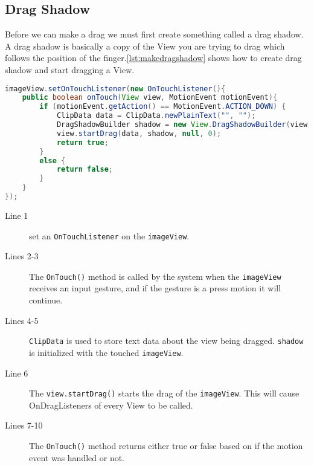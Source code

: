 \subsection*{Drag Shadow}
Before we can make a drag we must first create something called a drag shadow. A drag shadow is basically a copy of the View you are trying to drag which follows the position of the finger.\autoref{lst:makedragshadow} shows how to create drag shadow and start dragging a View.
\begin{lstlisting}[language=java,firstnumber=1,caption={How to create a drag shadow, and start drag},label=lst:makedragshadow]
imageView.setOnTouchListener(new OnTouchListener(){
	public boolean onTouch(View view, MotionEvent motionEvent){
		if (motionEvent.getAction() == MotionEvent.ACTION_DOWN) {
			ClipData data = ClipData.newPlainText("", "");
			DragShadowBuilder shadow = new View.DragShadowBuilder(view);
			view.startDrag(data, shadow, null, 0);
			return true;
		}
		else {
			return false;
		}	
	}
});
\end{lstlisting}
\begin{description}
\item[Line 1] set an \lstinline|OnTouchListener| on the \lstinline|imageView|.
\item[Lines 2-3] The \lstinline|OnTouch()| method is called by the system when the \lstinline|imageView| receives an input gesture, and if the gesture is a press motion it will continue.
\item[Lines 4-5] \lstinline|ClipData| is used to store text data about the view being dragged. \lstinline|shadow| is initialized with the touched \lstinline|imageView|.
\item[Line 6] The \lstinline|view.startDrag()| starts the drag of the \lstinline|imageView|. This will cause OnDragListeners of every View to be called. 
\item[Lines 7-10] The \lstinline|OnTouch()| method returns either true or false based on if the motion event was handled or not.
\end{description}
